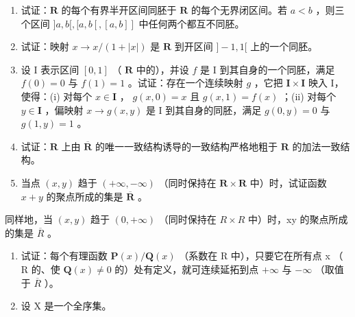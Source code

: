 \begin{enumerate}
\def\labelenumi{\arabic{enumi})}
\item
试证：\(\mathbf{R}\) 的每个有界半开区间同胚于 \(\mathbf{R}\) 的每个无界闭区间。若 \(a < b\) ，则三个区间 \(]a, b[, [a, b[, [a, b]]\) 中任何两个都互不同胚。
\item
试证：映射 \(x \to x / (1 + |x|)\) 是 \(\mathbf{R}\) 到开区间 \(] - 1, 1[\) 上的一个同胚。
\item
设 I 表示区间 \([0, 1]\) （ \(\mathbf{R}\) 中的），并设 \(f\) 是 I 到其自身的一个同胚，满足 \(f(0) = 0\) 与 \(f(1) = 1\) 。试证：存在一个连续映射 \(g\) ，它把 \(\mathbf{I} \times \mathbf{I}\) 映入 I，使得：(i) 对每个 \(x \in \mathbf{I}\) ， \(g(x, 0) = x\) 且 \(g(x, 1) = f(x)\) ；(ii) 对每个 \(y \in \mathbf{I}\) ，偏映射 \(x \to g(x, y)\) 是 I 到其自身的同胚，满足 \(g(0, y) = 0\) 与 \(g(1, y) = 1\) 。
\item
试证：\(\mathbf{R}\) 上由 \(\overline{\mathbf{R}}\) 的唯一一致结构诱导的一致结构严格地粗于 \(\mathbf{R}\) 的加法一致结构。
\item
当点 \((x, y)\) 趋于 \((+\infty, -\infty)\) （同时保持在 \(\mathbf{R} \times \mathbf{R}\) 中）时，试证函数 \(x + y\) 的聚点所成的集是 \(\overline{\mathbf{R}}\) 。
\end{enumerate}

同样地，当 \((x,y)\) 趋于 \((0,+\infty)\) （同时保持在 \(R\times R\) 中）时，xy 的聚点所成的集是 \(\overline{R}\) 。

\begin{enumerate}
\def\labelenumi{\arabic{enumi})}
\setcounter{enumi}{5}
\item
试证：每个有理函数 \(\mathbf{P}(x)/\mathbf{Q}(x)\) （系数在 R 中），只要它在所有点 x （ R 的、使 \(\mathbf{Q}(x)\neq0\) 的）处有定义，就可连续延拓到点 \(+\infty\) 与 \(-\infty\) （取值于 \(\overline{R}\) ）。
\item
设 X 是一个全序集。
\end{enumerate}


